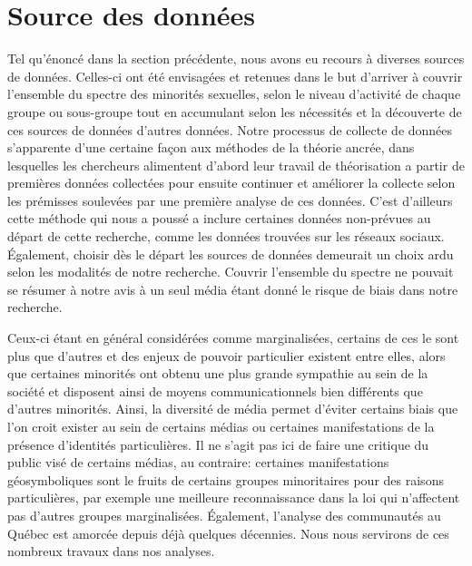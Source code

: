 \section{Source des données}
\label{sec:source_des_donn_es}
Tel qu'énoncé dans la section précédente, nous avons eu recours à diverses sources de données. 
Celles-ci ont été envisagées et retenues dans le but d'arriver à couvrir l'ensemble du spectre des minorités sexuelles, selon le niveau d'activité de chaque groupe ou sous-groupe tout en accumulant selon les nécessités et la découverte de ces sources de données d'autres données. 
Notre processus de collecte de données s'apparente d'une certaine façon aux méthodes de la théorie ancrée, dans lesquelles les chercheurs alimentent d'abord leur travail de théorisation a partir de premières données collectées pour ensuite continuer et améliorer la collecte selon les prémisses soulevées par une première analyse de ces données. 
C'est d'ailleurs cette méthode qui nous a poussé a inclure certaines données non-prévues au départ de cette recherche, comme les données trouvées sur les réseaux sociaux. 
Également, choisir dès le départ les sources de données demeurait un choix ardu selon les modalités de notre recherche. 
Couvrir l'ensemble du spectre \lgbt{} ne pouvait se résumer à notre avis à un seul média étant donné le risque de biais dans notre recherche.

Ceux-ci étant en général considérées comme marginalisées, certains de ces le sont plus que d'autres et des enjeux de pouvoir particulier existent entre elles, alors que certaines minorités ont obtenu une plus grande sympathie au sein de la société et disposent ainsi de moyens communicationnels bien différents que d'autres minorités. 
Ainsi, la diversité de média permet d'éviter certains biais que l'on croit exister au sein de certains médias ou certaines manifestations de la présence d'identités particulières. 
Il ne s'agit pas ici de faire une critique du public visé de certains médias, au contraire: certaines manifestations géosymboliques sont le fruits de certains groupes minoritaires pour des raisons particulières, par exemple une meilleure reconnaissance dans la loi qui n'affectent pas d'autres groupes marginalisées. 
Également, l'analyse des communautés \lgbt{} au Québec est amorcée depuis déjà quelques décennies. 
Nous nous servirons de ces nombreux travaux dans nos analyses.


